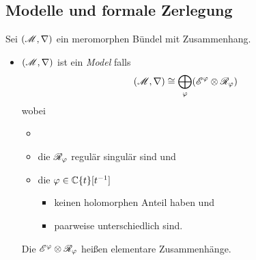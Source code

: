 \TODO

\TODO[\cite{sabbah2007isomonodromic}: Def II.2.24]
\subsection{Modelle und formale Zerlegung}%
\begin{comment}
  Durch das Tensorieren mit formalen Potenzreihen erhält man einen Funktor.
\end{comment}
\begin{defn}
  Sei $(\mathscr{M},\nabla)$ ein meromorphen Bündel mit Zusammenhang.
  \begin{itemize}
    \item $(\mathscr{M},\nabla)$ ist ein \emph{Model} falls
      \[
        (\mathscr{M},\nabla)
        \cong
        \bigoplus_\varphi(\mathscr{E}^\varphi\otimes\mathscr{R}_\varphi)
      \]
      wobei
      \begin{itemize}
        \item {}
        \item die $\mathscr{R}_\varphi$ regulär singulär sind und
        \item die
          $\varphi\in\mathbb{C}\{t\}[t^{-1}]$
          \begin{itemize}
            \item keinen holomorphen Anteil haben und
            \item paarweise unterschiedlich sind.
          \end{itemize}
      \end{itemize}
      Die $\mathscr{E}^\varphi\otimes\mathscr{R}_\varphi$ heißen elementare Zusammenhänge.
  \end{itemize}
\end{defn}
\begin{comment}
  \begin{thm}[Levelt-Turittin]
    Zu einem formalem meromorphen Zusammenhang gibt es, bis auf Zurückziehen,
    immer einen Isomorphismus zu einer direkten Summe formaler elementarer
    Zusammenhänge.
    \begin{rem}
      \textbf{Übergang:}
      Aber keinen konvergenten lift.
      Sektorweise aber schon mit asymptotischer Analysis
    \end{rem}
  \end{thm}
\end{comment}
